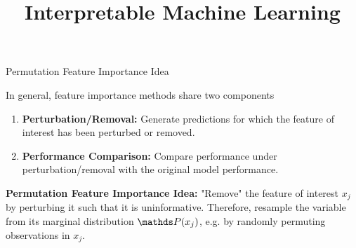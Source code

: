 \documentclass[11pt,compress,t,notes=noshow, aspectratio=169, xcolor=table]{beamer}
\title{Interpretable Machine Learning}
\date{}
\begin{document}
	\newcommand{\titlefigure}{figure_man/feature-importance.png}
    \newcommand{\learninggoals}{
    	\item Underdstand how PFI is computed
    	\item Understanding strengths and weaknesses
    	\item Testing Importance}
	
	
	

	

\begin{vbframe}{Permutation Feature Importance Idea }

In general, feature importance methods share two components
\lz
\begin{enumerate}
  \item \textbf{Perturbation/Removal:} Generate predictions for which the feature of interest has been perturbed or removed.
  \item \textbf{Performance Comparison:} Compare performance under perturbation/removal with the original model performance.
\end{enumerate}
\lz
\textbf{Permutation Feature Importance Idea:} "Remove" the feature of interest $x_j$ by perturbing it such that it is uninformative. Therefore, resample the variable from its marginal distribution $\P(x_j)$, e.g. by randomly permuting observations in $x_j$.





\end{vbframe}
\end{document}
